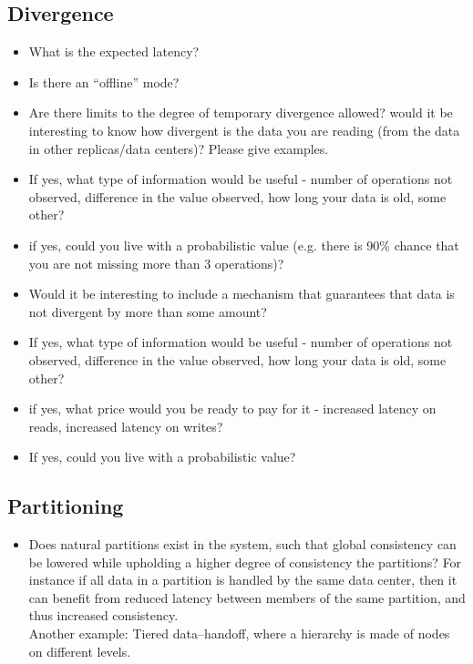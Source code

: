 \documentclass[11pt,a4paper]{report}
\begin{document}
\subsection{Divergence}
\begin{itemize}
\item What is the expected latency? 
\item Is there an ``offline'' mode?
\item Are there limits to the degree of temporary divergence allowed?
would it be interesting to know how divergent is the data you are reading (from the data in other replicas/data centers)? Please give examples.
\item If yes, what type of information would be useful - number of operations not observed, difference in the value observed, how long your data is old, some other?
\item if yes, could you live with a probabilistic value (e.g. there is 90\% chance that you are not missing more than 3 operations)?
\item Would it be interesting to include a mechanism that guarantees that data is not divergent by more than some amount?
\item If yes, what type of information would be useful - number of operations not observed, difference in the value observed, how long your data is old, some other?
\item if yes, what price would you be ready to pay for it - increased latency on reads, increased latency on writes?
\item If yes, could you live with a probabilistic value?
\end{itemize}

\subsection{Partitioning}
\begin{itemize}
\item Does natural partitions exist in the system, such that global consistency can be lowered while upholding a higher degree of consistency the partitions? For instance if all data in a partition is handled by the same data center, then it can benefit from reduced latency between members of the same partition, and thus increased consistency.\\
Another example: Tiered data--handoff, where a hierarchy is made of nodes on different levels.
\end{itemize}
\end{document}
